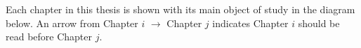 \documentclass[12pt]{amsart}
\theoremstyle{plain}
\theoremstyle{definition}
\begin{document}
Each chapter in this thesis is shown with its main object of study in the diagram below.
An arrow from Chapter $i$ $\to$ Chapter $j$ indicates Chapter $i$ should be read before Chapter $j$.
\end{document}
